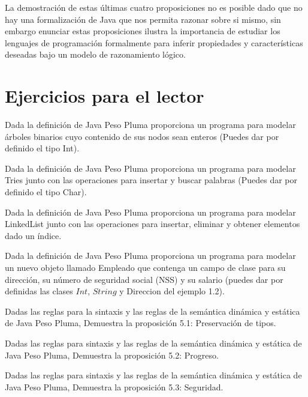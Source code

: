 La demostración de estas últimas cuatro proposiciones no es posible dado que no hay una formalización de \textsf{Java} que nos permita razonar sobre si mismo, sin embargo enunciar estas proposiciones ilustra la importancia de estudiar los lenguajes de programación formalmente para inferir propiedades y características deseadas bajo un modelo de razonamiento lógico.


\section{Ejercicios para el lector}

\begin{exercise}
    Dada la definición de \textsf{Java Peso Pluma} proporciona un programa para modelar árboles binarios cuyo contenido de sus nodos sean enteros (Puedes dar por definido el tipo \textsf{Int}).
\end{exercise}

\bigskip


\begin{exercise}
    Dada la definición de \textsf{Java Peso Pluma} proporciona un programa para modelar Tries junto con las operaciones para insertar y buscar palabras (Puedes dar por definido el tipo \textsf{Char}).
\end{exercise}

\bigskip

\begin{exercise}
    Dada la definición de \textsf{Java Peso Pluma} proporciona un programa para modelar LinkedList junto con las operaciones para insertar, eliminar y obtener elementos dado un índice.
\end{exercise}

\bigskip

\begin{exercise}
    Dada la definición de \textsf{Java Peso Pluma} proporciona un programa para modelar un nuevo objeto llamado \textsf{Empleado} que contenga un campo de clase para su dirección, su número de seguridad social (NSS) y su salario (puedes dar por definidas las clases $Int$, $String$ y \textsf{Direccion} del ejemplo 1.2).
\end{exercise}

\bigskip

\begin{exercise}
    Dadas las reglas para la sintaxis y las reglas de la semántica dinámica y estática de \textsf{Java Peso Pluma}, Demuestra la proposición 5.1: Preservación de tipos.
\end{exercise}

\bigskip

\begin{exercise}
   Dadas las reglas para sintaxis y las reglas de la semántica dinámica y estática de \textsf{Java Peso Pluma}, Demuestra la proposición 5.2: Progreso.
\end{exercise}

\bigskip

\begin{exercise}
   Dadas las reglas para sintaxis y las reglas de la semántica dinámica y estática de \textsf{Java Peso Pluma}, Demuestra la proposición 5.3: Seguridad.
\end{exercise}